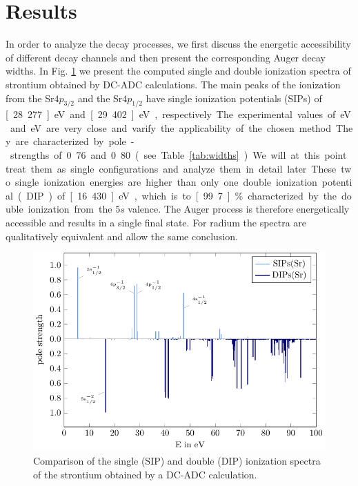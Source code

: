 \section{Results}
\label{section:results}

In order to analyze the decay processes, we first discuss the energetic
accessibility of different decay channels and then present the corresponding
Auger decay widths.
In Fig. \ref{fig:sdip} we present the computed
single and double ionization spectra
of strontium obtained by DC-ADC calculations. The main peaks of the
ionization
from the Sr$4p_{3/2}$ and the Sr$4p_{1/2}$ have single ionization potentials (SIPs)
of \unit[28.277]{eV} and \unit[29.402]{eV}, respectively. The experimental
values of \unit[]{eV} and \unit[]{eV} are very close and varify the applicability
of the chosen method.
They are characterized by pole-strengths of 0.76 and 0.80
(see Table \ref{tab:widths}). We will at this point treat them as single
configurations and analyze them in detail later.
These two single ionization energies are higher
than only one double ionization potential (DIP) of \unit[16.430]{eV},
which is to \unit[99.7]{\%} characterized by the double ionization from
the $5s$ valence. The Auger process is therefore energetically accessible and
results in a single final state.
For radium the spectra are qualitatively equivalent and
allow the same conclusion.

\begin{figure}[h]
 \centering
 \includegraphics[width=\columnwidth]{pics/Sr_rel_sdip.pdf}
 \caption{Comparison of the single (SIP) and double (DIP) ionization spectra
          of the strontium obtained by a DC-ADC calculation.}
 \label{fig:sdip}
\end{figure}

